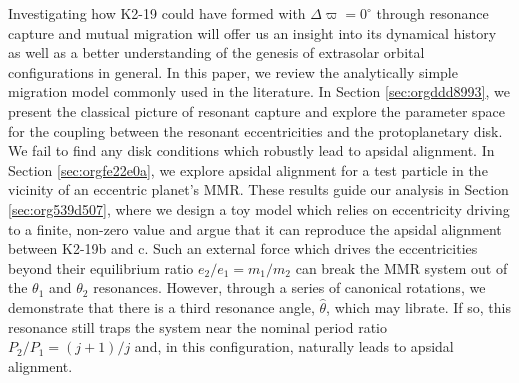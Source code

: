 \documentclass[usenatbib,twocolumn]{mnras}
\begin{document}
Investigating how K2-19 could have formed with \(\Delta\varpi=0^\circ\)
through resonance capture and mutual migration will offer us an
insight into its dynamical history as well as a better understanding
of the genesis of extrasolar orbital configurations in general.  In
this paper, we review the analytically simple migration model commonly
used in the literature.  In Section \ref{sec:orgddd8993}, we present the classical picture of resonant capture and
explore the parameter space for the coupling between the resonant
eccentricities and the protoplanetary disk. We fail to find any disk
conditions which robustly lead to apsidal alignment.  In Section \ref{sec:orgfe22e0a}, we explore apsidal alignment for a test particle in
the vicinity of an eccentric planet's MMR. These results guide our
analysis in Section \ref{sec:org539d507}, where we design a toy model which
relies on eccentricity driving to a finite, non-zero value and argue
that it can reproduce the apsidal alignment between K2-19b and c.
Such an external force which drives the eccentricities beyond their
equilibrium ratio \(e_2/e_1 = m_1/m_2\) can
break the MMR system out of the \(\theta_1\) and \(\theta_2\) resonances.
However, through a series of canonical rotations, we demonstrate that
there is a third resonance angle, \(\hat\theta\), which may
librate.  If so, this resonance still traps the system near the nominal
period ratio \(P_2/P_1=(j+1)/j\) and, in this configuration, naturally
leads to apsidal alignment.
\end{document}
